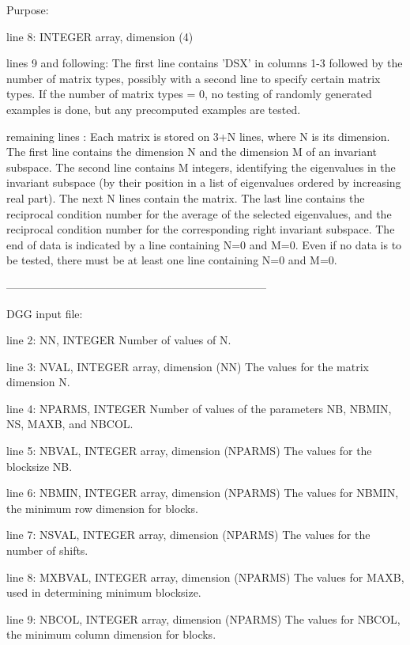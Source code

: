 \begin{DoxyParagraph}{Purpose\+: }
\begin{DoxyVerb}
 line 8:  INTEGER array, dimension (4)

 lines 9 and following: The first line contains 'DSX' in columns 1-3
          followed by the number of matrix types, possibly with
          a second line to specify certain matrix types.
          If the number of matrix types = 0, no testing of randomly
          generated examples is done, but any precomputed examples
          are tested.

 remaining lines : Each matrix is stored on 3+N lines, where N is its
          dimension. The first line contains the dimension N and the
          dimension M of an invariant subspace. The second line
          contains M integers, identifying the eigenvalues in the
          invariant subspace (by their position in a list of
          eigenvalues ordered by increasing real part). The next N
          lines contain the matrix. The last line contains the
          reciprocal condition number for the average of the selected
          eigenvalues, and the reciprocal condition number for the
          corresponding right invariant subspace. The end of data is
          indicated by a line containing N=0 and M=0. Even if no data
          is to be tested, there must be at least one line containing
          N=0 and M=0.

-----------------------------------------------------------------------

 DGG input file:

 line 2:  NN, INTEGER
          Number of values of N.

 line 3:  NVAL, INTEGER array, dimension (NN)
          The values for the matrix dimension N.

 line 4:  NPARMS, INTEGER
          Number of values of the parameters NB, NBMIN, NS, MAXB, and
          NBCOL.

 line 5:  NBVAL, INTEGER array, dimension (NPARMS)
          The values for the blocksize NB.

 line 6:  NBMIN, INTEGER array, dimension (NPARMS)
          The values for NBMIN, the minimum row dimension for blocks.

 line 7:  NSVAL, INTEGER array, dimension (NPARMS)
          The values for the number of shifts.

 line 8:  MXBVAL, INTEGER array, dimension (NPARMS)
          The values for MAXB, used in determining minimum blocksize.

 line 9:  NBCOL, INTEGER array, dimension (NPARMS)
          The values for NBCOL, the minimum column dimension for
          blocks.


\end{DoxyVerb}
\end{DoxyParagraph}
